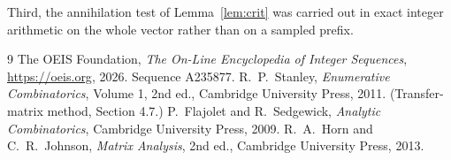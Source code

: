 \documentclass[11pt,a4paper]{article}
\theoremstyle{plain}
\theoremstyle{definition}
\begin{document}
Third, the annihilation test of Lemma~\ref{lem:crit} was carried out in exact integer
arithmetic on the whole vector rather than on a sampled prefix.

\begin{thebibliography}{9}
 The OEIS Foundation, \emph{The On-Line Encyclopedia of Integer
Sequences}, \url{https://oeis.org}, 2026. Sequence A235877.
 R.~P.~Stanley, \emph{Enumerative Combinatorics}, Volume 1, 2nd ed.,
Cambridge University Press, 2011. (Transfer-matrix method, Section 4.7.)
 P.~Flajolet and R.~Sedgewick, \emph{Analytic Combinatorics}, Cambridge
University Press, 2009.
 R.~A.~Horn and C.~R.~Johnson, \emph{Matrix Analysis}, 2nd ed., Cambridge
University Press, 2013.
\end{thebibliography}
\end{document}
